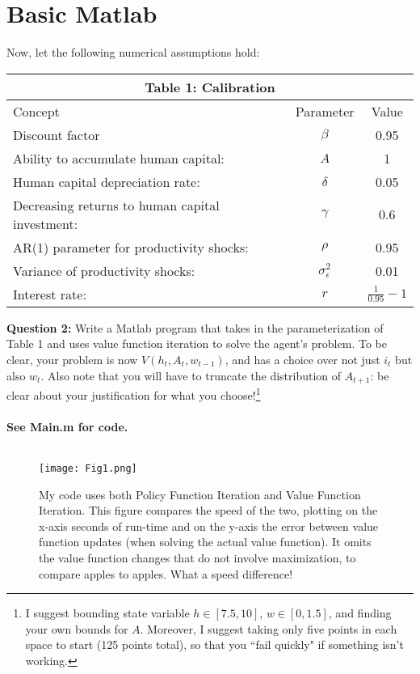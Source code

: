 \documentclass[11pt]{article}
\begin{document}
\section{Basic Matlab}
Now, let the following numerical assumptions hold:
\begin{table}[ht!]
\centering
\begin{tabular}{lcc}
\hline
\hline
\multicolumn{3}{c}{Table 1: Calibration}\\
\hline
Concept & Parameter & Value \\ 
Discount factor & $\beta$ & 0.95\\
Ability to accumulate human capital: &  $A$ & 1\\
Human capital depreciation rate:&  $\delta$  & 0.05\\
Decreasing returns to human capital investment: & $\gamma$  & 0.6\\
AR(1) parameter for productivity shocks: & $\rho$  & 0.95\\
Variance of productivity shocks: &  $\sigma^2_\epsilon$  & 0.01\\
Interest rate: &  $r$  & $\frac{1}{0.95}-1$\\
\hline
\hline
\end{tabular}
\end{table}

\textbf{Question 2:} Write a Matlab program that takes in the parameterization of Table 1 and uses value function iteration to solve the agent's problem.  To be clear, your problem is now $V(h_t,A_t,w_{t-1})$, and has a choice over not just $i_t$ but also $w_t$.  Also note that you will have to truncate the distribution of $A_{t+1}$:  be clear about your justification for what you choose!\footnote{I suggest bounding state variable $h\in\left[7.5,10\right]$, $w\in\left[0 , 1.5\right]$, and finding your own bounds for $A$.  Moreover, I suggest taking only five points in each space to start (125 points total), so that you ``fail quickly" if something isn't working.  }\\
\ \\
\textbf{See Main.m for code.}\\
\ \\

\begin{figure}[ht!]
\centering
\texttt{[image: Fig1.png]}
\caption{My code uses both Policy Function Iteration and Value Function Iteration.  This figure compares the speed of the two, plotting on the x-axis seconds of run-time and on the y-axis the error between value function updates (when solving the actual value function).  It omits the value function changes that do not involve maximization, to compare apples to apples.  What a speed difference!}
\end{figure}
\end{document}
